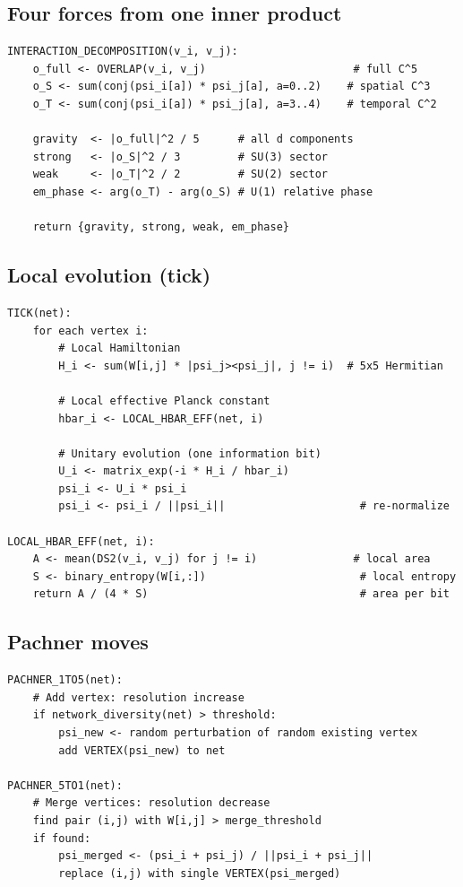 \documentclass[12pt]{article}
\theoremstyle{remark}
\theoremstyle{definition}
\begin{document}
\subsection{Four forces from one inner product}

\begin{verbatim}
INTERACTION_DECOMPOSITION(v_i, v_j):
    o_full <- OVERLAP(v_i, v_j)                       # full C^5
    o_S <- sum(conj(psi_i[a]) * psi_j[a], a=0..2)    # spatial C^3
    o_T <- sum(conj(psi_i[a]) * psi_j[a], a=3..4)    # temporal C^2

    gravity  <- |o_full|^2 / 5      # all d components
    strong   <- |o_S|^2 / 3         # SU(3) sector
    weak     <- |o_T|^2 / 2         # SU(2) sector
    em_phase <- arg(o_T) - arg(o_S) # U(1) relative phase

    return {gravity, strong, weak, em_phase}
\end{verbatim}

\subsection{Local evolution (tick)}

\begin{verbatim}
TICK(net):
    for each vertex i:
        # Local Hamiltonian
        H_i <- sum(W[i,j] * |psi_j><psi_j|, j != i)  # 5x5 Hermitian

        # Local effective Planck constant
        hbar_i <- LOCAL_HBAR_EFF(net, i)

        # Unitary evolution (one information bit)
        U_i <- matrix_exp(-i * H_i / hbar_i)
        psi_i <- U_i * psi_i
        psi_i <- psi_i / ||psi_i||                     # re-normalize

LOCAL_HBAR_EFF(net, i):
    A <- mean(DS2(v_i, v_j) for j != i)               # local area
    S <- binary_entropy(W[i,:])                        # local entropy
    return A / (4 * S)                                 # area per bit
\end{verbatim}

\subsection{Pachner moves}

\begin{verbatim}
PACHNER_1TO5(net):
    # Add vertex: resolution increase
    if network_diversity(net) > threshold:
        psi_new <- random perturbation of random existing vertex
        add VERTEX(psi_new) to net

PACHNER_5TO1(net):
    # Merge vertices: resolution decrease
    find pair (i,j) with W[i,j] > merge_threshold
    if found:
        psi_merged <- (psi_i + psi_j) / ||psi_i + psi_j||
        replace (i,j) with single VERTEX(psi_merged)
\end{verbatim}
\end{document}
